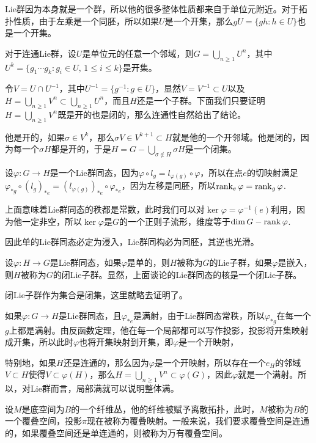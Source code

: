 Lie群因为本身就是一个群，所以他的很多整体性质都来自于单位元附近。对于拓扑性质，由于左乘是一个同胚，所以如果$U$是一个开集，那么$gU=\{gh:h\in U\}$也是一个开集。

\para 对于连通Lie群，设$U$是单位元的任意一个邻域，则$G=\bigcup_{n\geq 1}U^n$，其中$U^k=\{g_1\cdots g_k:g_i\in U,\, 1\leq i \leq k\}$是开集。

令$V=U\cap U^{-1}$，其中$U^{-1}=\{g^{-1}:g\in U\}$，显然$V=V^{-1}\subset U$以及$H=\bigcup_{n\geq 1}V^n\subset \bigcup_{n\geq 1}U^n$，而且$H$还是一个子群。下面我们只要证明$H=\bigcup_{n\geq 1}V^n$既是开的也是闭的，那么连通性自然给出了结论。

他是开的，如果$\sigma\in V^k$，那么$\sigma V\in V^{k+1}\subset H$就是他的一个开邻域。他是闭的，因为每一个$\sigma H$都是开的，于是$H=G-\bigcup_{\sigma\notin H}\sigma H$是一个闭集。

\para 设$\varphi:G\to H$是一个Lie群同态，因为$\varphi\circ l_g=l_{\varphi(g)}\circ \varphi$，所以在点$e$的切映射满足$\varphi_{*g}\circ (l_g)_{*e}=(l_{\varphi(g)})_{*e}\circ \varphi_{*e}$，因为左移是同胚，所以$\operatorname{rank}_e \varphi=\operatorname{rank}_g \varphi$.

上面意味着Lie群同态的秩都是常数，此时我们可以对$\ker \varphi=\varphi^{-1}(e)$利用，因为他一定非空，所以$\ker \varphi$是$G$的一个正则子流形，维度等于$\dim G-\operatorname{rank} \varphi$.

\para 因此单的Lie群同态必定为浸入，Lie群同构必为同胚，其逆也光滑。

\para 设$\varphi:H\to G$是Lie群同态，如果$\varphi$是单的，则$H$被称为$G$的Lie子群，如果$\varphi$是嵌入，则$H$被称为$G$的闭Lie子群。显然，上面谈论的Lie群同态的核是一个闭Lie子群。

闭Lie子群作为集合是闭集，这里就略去证明了。

\para 如果$\varphi:G\to H$是Lie群同态，且$\varphi_{*e}$是满射，由于Lie群同态常秩，所以$\varphi_{*g}$在每一个$g$上都是满射。由反函数定理，他在每一个局部都可以写作投影，投影将开集映射成开集，所以此时$\varphi$也将开集映射到开集，即$\varphi$是一个开映射，

特别地，如果$H$还是连通的，那么因为$\varphi$是一个开映射，所以存在一个$e_H$的邻域$V\subset H$使得$V\subset \varphi(H)$，那么$H=\bigcup_{n\geq 1}V^n\subset \varphi(G)$，因此$\varphi$就是一个满射。所以，对Lie群而言，局部满就可以说明整体满。

\para 设$M$是底空间为$B$的一个纤维丛，他的纤维被赋予离散拓扑，此时，$M$被称为$B$的一个覆叠空间，投影$\pi$现在被称为覆叠映射。一般来说，我们要求覆叠空间是连通的，如果覆叠空间还是单连通的，则被称为万有覆叠空间。

